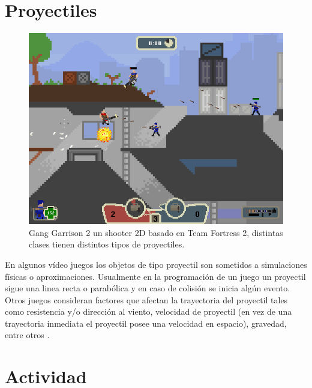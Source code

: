 \section{Proyectiles}
\setlength\intextsep{0pt}
\begin{figure}
\includegraphics[width=\linewidth]{media/Gang_Garrison_2.png}
\caption{Gang Garrison 2 un shooter 2D basado en Team Fortress 2, distintas clases tienen distintos tipos de proyectiles.}
\label{fig:ganggarrison2}
\end{figure}

En algunos vídeo juegos los objetos de tipo proyectil son sometidos a simulaciones físicas o aproximaciones. Usualmente en la programación de un juego un proyectil sigue una linea recta o parabólica y en caso de colisión se inicia algún evento. Otros juegos consideran factores que afectan la trayectoria del proyectil tales como resistencia y/o dirección al viento, velocidad de proyectil (en vez de una trayectoria inmediata el proyectil posee una velocidad en espacio), gravedad, entre otros \cite{fifa_physics}.~\\

\section{Actividad}
